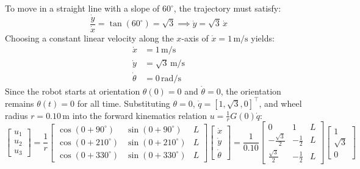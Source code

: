 \begin{enumerate}[label=\textbf{(\alph*)}]
\begin{enumerate}[label=\Roman*.]
\begin{enumerate}[label=\arabic*.]
            To move in a straight line with a slope of $60^\circ$, the trajectory must satisfy:
            \begin{equation}
                \frac{\dot{y}}{\dot{x}} = \tan(60^\circ) = \sqrt{3} \implies \dot{y} = \sqrt{3} \, \dot{x}
            \end{equation}
            Choosing a constant linear velocity along the $x$-axis of $\dot{x} = 1\,\text{m/s}$ yields:
            \begin{align}
                \dot{x} &= 1\,\text{m/s} \\
                \dot{y} &= \sqrt{3}\,\text{m/s} \\
                \dot{\theta} &= 0\,\text{rad/s}
            \end{align}
            Since the robot starts at orientation $\theta(0) = 0$ and $\dot{\theta} = 0$, the orientation remains $\theta(t) = 0$ for all time. Substituting $\theta = 0$, $\dot{q} = [1, \sqrt{3}, 0]^\top$, and wheel radius $r = 0.10\,\text{m}$ into the forward kinematics relation $u = \frac{1}{r} G(0) \dot{q}$:
            \begin{equation}
                \begin{bmatrix} u_1 \\ u_2 \\ u_3 \end{bmatrix} = \frac{1}{r} \begin{bmatrix} 
                    \cos(0 + 90^\circ) & \sin(0 + 90^\circ) & L \\ 
                    \cos(0 + 210^\circ) & \sin(0 + 210^\circ) & L \\ 
                    \cos(0 + 330^\circ) & \sin(0 + 330^\circ) & L 
                \end{bmatrix} \begin{bmatrix} \dot{x} \\ \dot{y} \\ \dot{\theta} \end{bmatrix} = \frac{1}{0.10} \begin{bmatrix} 
                    0 & 1 & L \\ 
                    -\frac{\sqrt{3}}{2} & -\frac{1}{2} & L \\ 
                    \frac{\sqrt{3}}{2} & -\frac{1}{2} & L 
                \end{bmatrix} \begin{bmatrix} 1 \\ \sqrt{3} \\ 0 \end{bmatrix}

\end{equation}
\end{enumerate}
\end{enumerate}
\end{enumerate}
